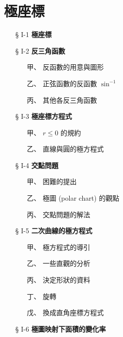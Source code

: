 
\section{極座標}
\label{sec:b5s-ch1}

\begin{center}
\begin{minipage}{0.75\textwidth}
\begin{itemize}[leftmargin=2em, itemsep=0.3em]
  \item[§ I-1] \textbf{極座標}
  \item[§ I-2] \textbf{反三角函數}
  \begin{itemize}[leftmargin=2em, itemsep=0.2em]
    \item[甲、] 反函數的用意與圖形
    \item[乙、] 正弦函數的反函數 $\sin^{-1}$
    \item[丙、] 其他各反三角函數
  \end{itemize}
  \item[§ I-3] \textbf{極座標方程式}
  \begin{itemize}[leftmargin=2em, itemsep=0.2em]
    \item[甲、] $r \le 0$ 的規約
    \item[乙、] 直線與圓的極方程式
  \end{itemize}
  \item[§ I-4] \textbf{交點問題}
  \begin{itemize}[leftmargin=2em, itemsep=0.2em]
    \item[甲、] 困難的提出
    \item[乙、] 極圖 (polar chart) 的觀點
    \item[丙、] 交點問題的解法
  \end{itemize}
  \item[§ I-5] \textbf{二次曲線的極方程式}
  \begin{itemize}[leftmargin=2em, itemsep=0.2em]
    \item[甲、] 極方程式的導引
    \item[乙、] 一些直觀的分析
    \item[丙、] 決定形狀的資料
    \item[丁、] 旋\quad 轉
    \item[戊、] 換成直角座標方程式
  \end{itemize}
  \item[§ I-6] \textbf{極圖映射下面積的變化率}
\end{itemize}
\end{minipage}
\end{center}

